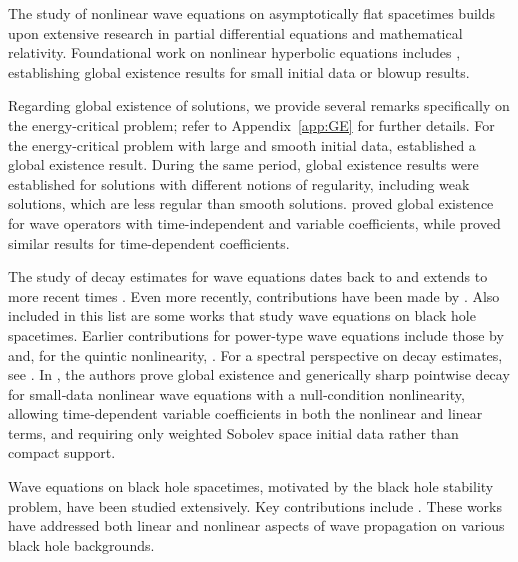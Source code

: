 \documentclass[10pt,a4paper,reqno]{amsart}
\theoremstyle{definition}
\theoremstyle{remark}
\numberwithin{equation}{section}
\begin{document}
\vspace{.2cm}

The study of nonlinear wave equations on asymptotically flat spacetimes builds upon extensive research in partial differential equations and mathematical relativity. Foundational work on nonlinear hyperbolic equations includes \cite{K1,K2,K3,Ch,John}, establishing global existence results for small initial data or blowup results. 

Regarding global existence of solutions, we provide several remarks specifically on the energy-critical problem; refer to Appendix~\ref{app:GE} for further details. For the energy-critical problem with large and smooth initial data, \cite{ShatahStruwe1993} established a global existence result. During the same period, global existence results were established for solutions with different notions of regularity, including weak solutions, which are less regular than smooth solutions. \cite{IbrahimMajdoub} proved global existence for wave operators with time-independent and variable coefficients, while \cite{LaiZhou} proved similar results for time-dependent coefficients.

The study of decay estimates for wave equations dates back to \cite{Lax1963} and extends to more recent times \cite{K1,K2,K3,KP,Ch}. Even more recently, contributions have been made by \cite{Looi21,Looi22,Looi22.2,Looi22.3,Looi2023,LooiTohaneanu,MiaoPeiYu,Mor24,MW23,MTT,OliSte,Pec,Schlag2021,Schlue2013,Sha,SW,Tataru2013}. Also included in this list are some works that study wave equations on black hole spacetimes. Earlier contributions for power-type wave equations include those by \cite{GeorgievLindbladSogge1997} and, for the quintic nonlinearity, \cite{Gri}. For a spectral perspective on decay estimates, see \cite{BoucletBurq2021}.
In \cite{LooiTohaneanu}, the authors prove global existence and generically sharp pointwise decay for small‐data nonlinear wave equations with a null‐condition nonlinearity, allowing time‐dependent variable coefficients in both the nonlinear and linear terms, and requiring only weighted Sobolev space initial data rather than compact support.

Wave equations on black hole spacetimes, motivated by the black hole stability problem, have been studied extensively. Key contributions include \cite{AB,DR09,DR10,DR11,DR13,DRS,KS,KS1,LindbladTohaneanu2018,LindbladTohaneanu2020,Luk2013,MTT,Tataru2013,TT,Toh2022,Hin22,Angelopoulos2018,Angelopoulos2021a,Angelopoulos2021b,Angelopoulos:2018uwb}. These works have addressed both linear and nonlinear aspects of wave propagation on various black hole backgrounds.
\end{document}
